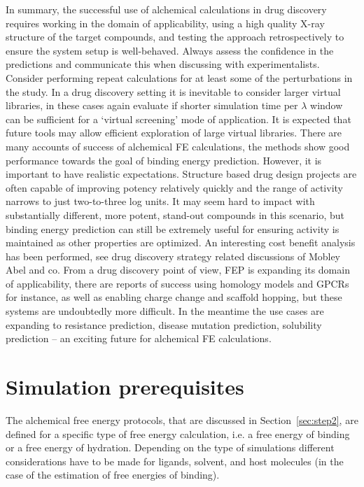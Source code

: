 \documentclass[9pt,bestpractices]{livecoms}
\begin{document}
In summary, the successful use of alchemical calculations in drug discovery requires working in the domain of applicability, using a high quality X-ray structure of the target compounds, and testing the approach retrospectively to ensure the system setup is well-behaved. Always assess the confidence in the predictions and communicate this when discussing with experimentalists. Consider performing repeat calculations for at least some of the perturbations in the study. In a drug discovery setting it is inevitable to consider larger virtual libraries, in these cases again evaluate if shorter simulation time per $\lambda$ window can be sufficient for a ‘virtual screening’ mode of application. It is expected that future tools may allow efficient exploration of large virtual libraries. There are many accounts of success of alchemical FE calculations, the methods show good performance towards the goal of binding energy prediction. However, it is important to have realistic expectations. Structure based drug design projects are often capable of improving potency relatively quickly and the range of activity narrows to just two-to-three log units. It may seem hard to impact with substantially different, more potent, stand-out compounds in this scenario, but binding energy prediction can still be extremely useful for ensuring activity is maintained as other properties are optimized. An interesting cost benefit analysis has been performed, see drug discovery strategy related discussions of Mobley Abel and co. From a drug discovery point of view, FEP is expanding its domain of applicability, there are reports of success using homology models and GPCRs for instance, as well as enabling charge change and scaffold hopping, but these systems are undoubtedly more difficult.  In the meantime the use cases are expanding to resistance prediction, disease mutation prediction, solubility prediction – an exciting future for alchemical FE calculations. 
%
%
%
%
\section{Simulation prerequisites}
\label{sec:step1}

The alchemical free energy protocols, that are discussed in Section~\ref{sec:step2}, are defined for a specific type of free energy calculation, i.e. a free energy of binding or a free energy of hydration. Depending on the type of simulations different considerations have to be made for ligands, solvent, and host molecules (in the case of the estimation of free energies of binding).
\end{document}
